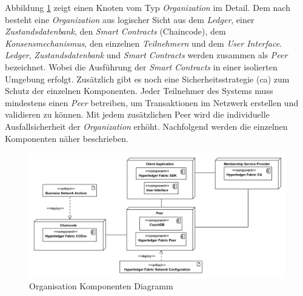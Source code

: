 Abbildung \ref{fig:organization-component-diagram} zeigt einen Knoten vom Typ \textit{Organization} im Detail. Dem nach besteht eine \textit{Organization} aus logischer Sicht aus dem \textit{Ledger}, einer \textit{Zustandsdatenbank}, den \textit{Smart Contracts} (Chaincode), dem \textit{Konsensmechanismus}, den einzelnen \textit{Teilnehmern} und dem \textit{User Interface}. \textit{Ledger}, \textit{Zustandsdatenbank} und \textit{Smart Contracts} werden zusammen als \textit{Peer} bezeichnet. Wobei die Ausführung der \textit{Smart Contracts} in einer isolierten Umgebung erfolgt. Zusätzlich gibt es noch eine Sicherheitsstrategie (\ac{ca}) zum Schutz der einzelnen Komponenten. Jeder Teilnehmer des Systems muss mindestens einen \textit{Peer} betreiben, um Transaktionen im Netzwerk erstellen und validieren zu können. Mit jedem zusätzlichen Peer wird die individuelle Ausfallsicherheit der \textit{Organization} erhöht. Nachfolgend werden die einzelnen Komponenten näher beschrieben.

\begin{figure}[H]
	\centering
	\includegraphics[width=1\linewidth]{pictures/organization-component-diagram}
	\caption[Organisation Komponenten Diagramm]{Organisation Komponenten Diagramm}
	\label{fig:organization-component-diagram}
\end{figure}

